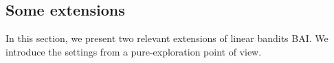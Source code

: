 
\subsection{Some extensions}\label{sec:lgc.complexity.examples}

In this section, we present two relevant extensions of linear bandits BAI. We introduce the settings from a pure-exploration point of view.



